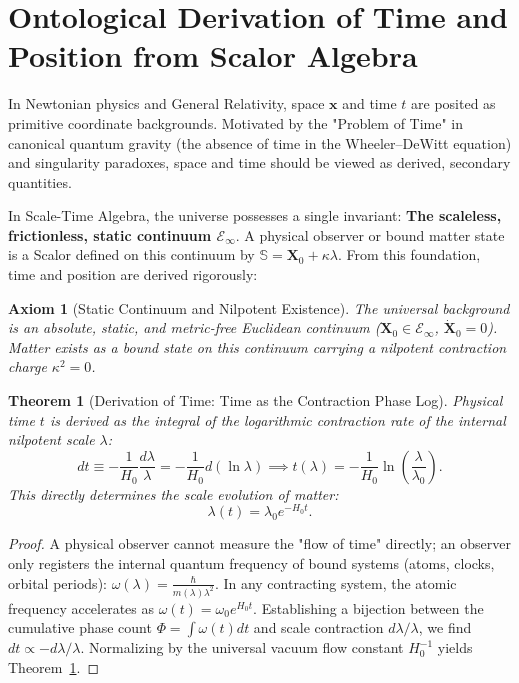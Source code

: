 \documentclass[11pt,a4paper]{article}
\newtheorem{theorem}{Theorem}[section]
\newtheorem{axiom}{Axiom}[section]
\begin{document}
\section{Ontological Derivation of Time and Position from Scalor Algebra}
\label{sec:zaman_konum_turetilis}

In Newtonian physics and General Relativity, space $\mathbf{x}$ and time $t$ are posited as primitive coordinate backgrounds. Motivated by the "Problem of Time" in canonical quantum gravity (the absence of time in the Wheeler--DeWitt equation) and singularity paradoxes, space and time should be viewed as derived, secondary quantities.

In Scale-Time Algebra, the universe possesses a single invariant: \textbf{The scaleless, frictionless, static continuum $\mathcal{E}_\infty$}. A physical observer or bound matter state is a Scalor defined on this continuum by $\mathbb{S} = \mathbf{X}_0 + \kappa \lambda$. From this foundation, time and position are derived rigorously:

\begin{axiom}[Static Continuum and Nilpotent Existence]
    \label{ax:statik_sureklilik_sc}
    The universal background is an absolute, static, and metric-free Euclidean continuum ($\mathbf{X}_0 \in \mathcal{E}_\infty$, $\dot{\mathbf{X}}_0 = 0$). Matter exists as a bound state on this continuum carrying a nilpotent contraction charge $\kappa^2 = 0$.
\end{axiom}

\begin{theorem}[Derivation of Time: Time as the Contraction Phase Log]
    \label{thm:zaman_turetilis}
    Physical time $t$ is derived as the integral of the logarithmic contraction rate of the internal nilpotent scale $\lambda$:
    \begin{equation}
        dt \equiv -\frac{1}{H_0} \frac{d\lambda}{\lambda} = -\frac{1}{H_0} d(\ln \lambda) \implies t(\lambda) = -\frac{1}{H_0} \ln\left(\frac{\lambda}{\lambda_0}\right).
        \label{eq:zaman_turetilis}
    \end{equation}
    This directly determines the scale evolution of matter:
    \begin{equation}
        \lambda(t) = \lambda_0 e^{-H_0 t}.
    \end{equation}
\end{theorem}

\begin{proof}
    A physical observer cannot measure the "flow of time" directly; an observer only registers the internal quantum frequency of bound systems (atoms, clocks, orbital periods): $\omega(\lambda) = \frac{\hbar}{m(\lambda) \lambda^2}$. In any contracting system, the atomic frequency accelerates as $\omega(t) = \omega_0 e^{H_0 t}$. Establishing a bijection between the cumulative phase count $\Phi = \int \omega(t) dt$ and scale contraction $d\lambda/\lambda$, we find $dt \propto -d\lambda/\lambda$. Normalizing by the universal vacuum flow constant $H_0^{-1}$ yields Theorem~\ref{thm:zaman_turetilis}.
\end{proof}
\end{document}
